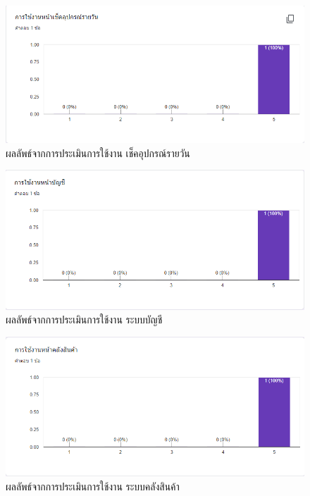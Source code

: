 \begin{figure}
  \begin{center}
    \includegraphics[width=\linewidth]{images/eval6.png}
  \end{center}
  \caption[ผลลัพธ์จากการประเมินการใช้งาน เช็คอุปกรณ์รายวัน]{ผลลัพธ์จากการประเมินการใช้งาน เช็คอุปกรณ์รายวัน}
  \label{fig:Eval6}
\end{figure}

\begin{figure}
  \begin{center}
    \includegraphics[width=\linewidth]{images/eval7.png}
  \end{center}
  \caption[ผลลัพธ์จากการประเมินการใช้งาน ระบบบัญชี]{ผลลัพธ์จากการประเมินการใช้งาน ระบบบัญชี}
  \label{fig:Eval7}
\end{figure}

\begin{figure}
  \begin{center}
    \includegraphics[width=\linewidth]{images/eval8.png}
  \end{center}
  \caption[ผลลัพธ์จากการประเมินการใช้งาน ระบบคลังสินค้า]{ผลลัพธ์จากการประเมินการใช้งาน ระบบคลังสินค้า}
  \label{fig:Eval8}
\end{figure}


